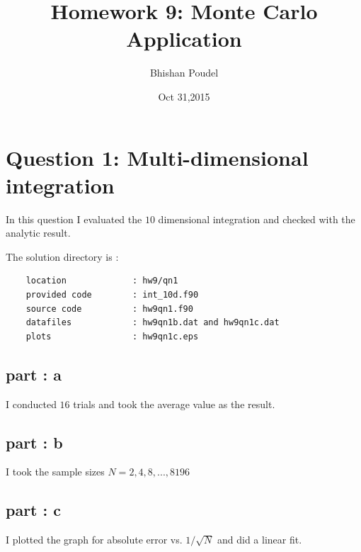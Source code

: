 \documentclass[11pt,a4paper,english]{article}
\title{Homework 9: Monte Carlo Application}
\author{Bhishan Poudel}
\date{Oct 31,2015}
\begin{document}
\maketitle
\tableofcontents
\listoffigures
\clearpage


\section{Question 1: Multi-dimensional integration }
In this question I evaluated the $10$ dimensional integration and checked with the analytic result. 

	The solution directory is :\\
	\begin{verbatim}
	location             : hw9/qn1
	provided code        : int_10d.f90
	source code          : hw9qn1.f90
	datafiles            : hw9qn1b.dat and hw9qn1c.dat
	plots                : hw9qn1c.eps
	\end{verbatim}
	
	\subsection{part : a }	
	I conducted $16$ trials and took the average value as the result.
		
	\subsection{part : b }
    I took the sample sizes $N = 2,4,8,...,8196$
	
	\subsection{part : c }
    I plotted the graph for absolute error vs. $1/\sqrt{N}$ and did a linear fit. 
\end{document}
